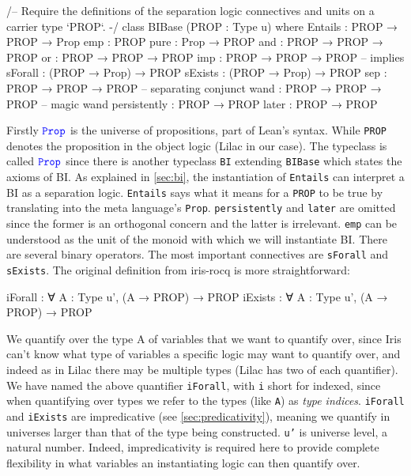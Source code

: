 \begin{leancode}
/--
Require the definitions of the separation logic connectives and units on a carrier type `PROP`.
-/
class BIBase (PROP : Type u) where
  Entails : PROP → PROP → Prop
  emp : PROP
  pure : Prop → PROP
  and : PROP → PROP → PROP
  or : PROP → PROP → PROP
  imp : PROP → PROP → PROP          -- implies
  sForall : (PROP → Prop) → PROP
  sExists : (PROP → Prop) → PROP
  sep : PROP → PROP → PROP          -- separating conjunct
  wand : PROP → PROP → PROP         -- magic wand
  persistently : PROP → PROP
  later : PROP → PROP
\end{leancode}

Firstly $\mathtt{\color{blue} Prop}$ is the universe of propositions, part of Lean's syntax. While \texttt{PROP} denotes the proposition in the object logic (Lilac in our case). The
typeclass is called $\mathtt{\color{blue} Prop}$ since there is another typeclass \texttt{BI} extending \texttt{BIBase} which states the axioms of BI. As
explained in \ref{sec:bi}, the instantiation of \texttt{Entails} can interpret a BI as a separation logic. \texttt{Entails} says what it means for a \texttt{PROP} to be true
by translating into the meta language's \texttt{Prop}. \texttt{persistently} and \texttt{later} are omitted since the former
is an orthogonal concern and the latter is irrelevant. \texttt{emp} can be understood as the unit of the monoid with which we will instantiate BI. There are several binary
operators. The most important connectives are  \texttt{sForall} and \texttt{sExists}. The original definition from iris-rocq is more straightforward:

\begin{leancode}
  iForall : ∀ A : Type u', (A → PROP) → PROP
  iExists : ∀ A : Type u',  (A → PROP) → PROP
\end{leancode}

We quantify over the type A of variables that we want to quantify over, since Iris can't know what type of variables a specific logic may want to quantify over, and indeed
as in Lilac there may be multiple types (Lilac has two of each quantifier). We have named the above quantifier \texttt{iForall}, with \texttt{i} short
for indexed, since when quantifying over types we refer to the types (like \texttt{A}) as \emph{type indices}. \texttt{iForall} and \texttt{iExists} are impredicative
(see \ref{sec:predicativity}), meaning we
quantify in universes larger than that of the type being constructed. \texttt{u'} is universe level, a natural number. Indeed, impredicativity is required here to provide complete flexibility in
what variables an instantiating logic can then quantify over.  

